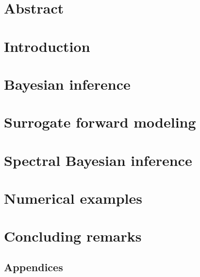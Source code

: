 \begin{refsection}

\section*{Abstract}


\section{Introduction}


\section{Bayesian inference} \label{sec:JCP:Bayesian}


\section{Surrogate forward modeling} \label{sec:JCP:PCE}


\section{Spectral Bayesian inference} \label{sec:JCP:SLE}


\section{Numerical examples} \label{sec:JCP:Examples}


\section{Concluding remarks} \label{sec:JCP:Conclusion}


\begin{subappendices}
\section*{Appendices}

\end{subappendices}

\printbibliography[heading=subbibliography]
\end{refsection}